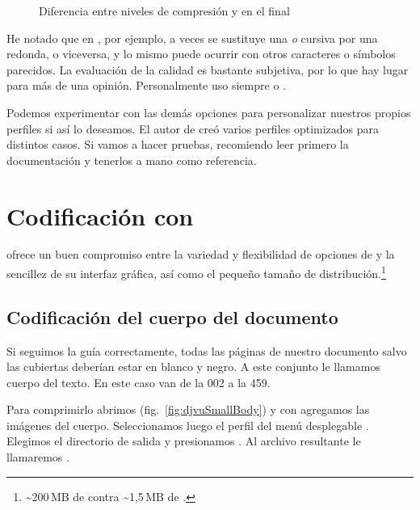 \documentclass[%
	a5paper,
	10pt,
	twoside,
	openright,
	final,
]{memoir}
\begin{document}
{	\begin{figure}
		\caption[Diferencia entre compresión \texttt{lossless} y \texttt{quasilossless}]{Diferencia entre niveles de compresión  y  en el \djvu final\label{fig:djvuSmallProfilesQuality}}
	\end{figure}

	He notado que en , por ejemplo, a veces se sustituye una \textit{o} cursiva por una redonda, o viceversa, y lo mismo puede ocurrir con otros caracteres o símbolos parecidos. La evaluación de la calidad es bastante subjetiva, por lo que hay lugar para más de una opinión. Personalmente uso siempre  o .

	Podemos experimentar con las demás opciones para personalizar nuestros propios perfiles si así lo deseamos. El autor de \djvusmallmod creó varios perfiles optimizados para distintos casos. Si vamos a hacer pruebas, recomiendo leer primero la documentación y tenerlos a mano como referencia.

	\section{Codificación con \djvusmall\label{sec:djvuSmall}} \djvusmall ofrece un buen compromiso entre la variedad y flexibilidad de opciones de \dexpress y la sencillez de su interfaz gráfica, así como el pequeño tamaño de distribución.\footnote{\textasciitilde 200\,MB de \dexpress contra \textasciitilde 1,5\,MB de \djvusmall.}

	\subsection{Codificación del cuerpo del documento\label{sec:djvuSmallBody}} Si seguimos la guía correctamente, todas las páginas de nuestro documento salvo las cubiertas deberían estar en blanco y negro. A este conjunto le llamamos cuerpo del texto. En este caso van de la 002 a la 459.

	Para comprimirlo abrimos \djvusmall (fig.~\ref{fig:djvuSmallBody}) y con  agregamos las imágenes del cuerpo. Seleccionamos luego el perfil  del menú desplegable . Elegimos el directorio de salida y presionamos . Al archivo resultante le llamaremos .

}
\end{document}
